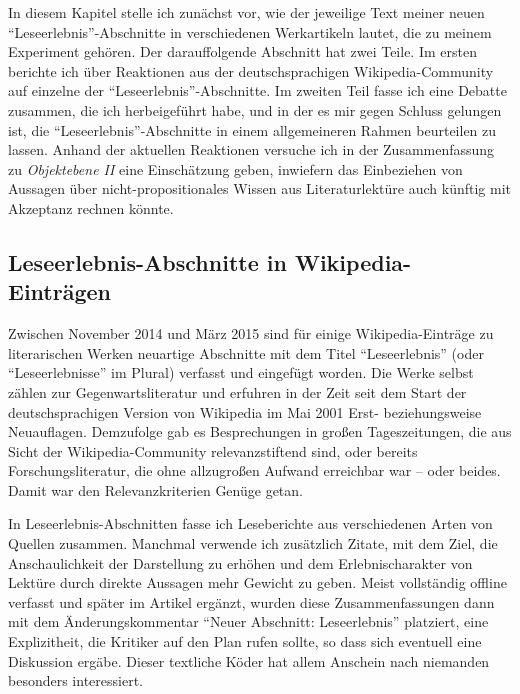 \documentclass[fontsize=12pt]{scrartcl}
\begin{document}
In diesem Kapitel stelle ich zun\"achst vor, wie der jeweilige Text meiner neuen "`Leseerlebnis"'-Abschnitte in verschiedenen Werkartikeln lautet, die zu meinem Experiment geh\"oren. Der darauffolgende Abschnitt hat zwei Teile. Im ersten berichte ich \"uber Reaktionen aus der deutschspra\-chi\-gen Wi\-ki\-pe\-dia-Community auf einzelne der "`Leseerlebnis"'-Abschnitte. Im zwei\-ten Teil fasse ich eine Debatte zusammen, die ich herbeigef\"uhrt habe, und in der es mir gegen Schluss gelungen ist, die "`Leseerlebnis"'-Abschnitte in einem allgemeineren Rahmen beurteilen zu lassen. Anhand der aktuellen Reaktionen versuche ich in der Zusammenfassung zu \textit{Objektebene II} eine Einsch\"atzung geben, inwiefern das Einbeziehen von Aussagen \"uber nicht-pro\-po\-si\-ti\-o\-na\-les Wissen aus Li\-te\-ra\-tur\-lekt\"ure auch k\"unftig mit Akzeptanz rechnen k\"onnte. 

\subsection{Leseerlebnis-Abschnitte in Wikipedia-Eintr\"agen}
\label{subsubsec:6.1}

Zwischen November 2014 und M\"arz 2015 sind f\"ur einige Wi\-ki\-pe\-dia-Eintr\"age zu li\-te\-ra\-rischen Werken neuartige Abschnitte mit dem Titel "`Leseerlebnis"' (oder "`Leseerlebnisse"' im Plural) verfasst und eingef\"ugt worden. Die Werke \mbox{selbst} z\"ahlen zur Gegenwarts\-li\-te\-ra\-tur\- und erfuhren in der Zeit seit dem Start der deutschspra\-chi\-gen Version von Wi\-ki\-pe\-dia im Mai 2001 Erst- beziehungsweise Neuauflagen. Demzufolge gab es Besprechungen in gro{\ss}en Tageszeitungen, die aus Sicht der Wi\-ki\-pe\-dia-Community relevanzstiftend sind, oder bereits For\-schungsli\-te\-ra\-tur, die ohne all\-zu\-gro{\ss}en Aufwand erreichbar war -- oder beides. Damit war den Relevanzkriterien Gen\"uge getan. 

In Leseerlebnis-Abschnitten fasse ich Leseberichte aus verschiedenen Arten von Quel\-len zusammen. Manchmal verwende ich zus\"atzlich Zitate, mit dem Ziel, die An\-schau\-lich\-keit der Darstellung zu erh\"ohen und dem Erlebnischarakter von Lekt\"ure durch direkte Aussagen mehr Gewicht zu geben. Meist vollst\"andig offline verfasst und sp\"ater im Artikel erg\"anzt, wurden diese Zusammenfassungen dann mit dem \"Anderungskommentar "`Neuer Abschnitt: Leseerlebnis"' platziert, eine Explizitheit, die Kritiker\textsuperscript{\tiny *} auf den Plan rufen sollte, so dass sich eventuell eine Dis\-kus\-si\-on erg\"abe. Dieser textliche K\"oder hat allem Anschein nach niemanden besonders interessiert.
\end{document}
